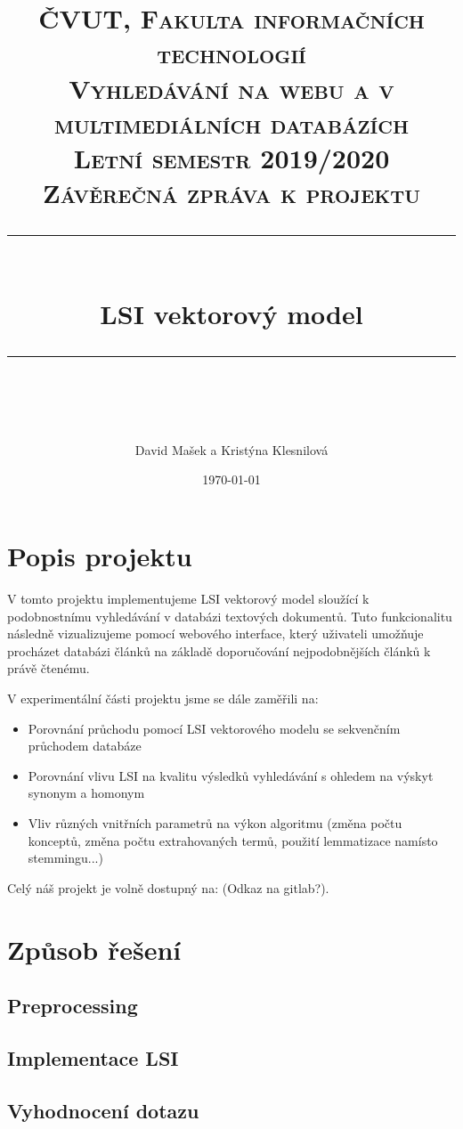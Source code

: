 \documentclass[11pt]{scrartcl} %
\title{	
	\normalfont\normalsize
	\textsc{ČVUT, Fakulta informačních technologií}\\ %
	\textsc{Vyhledávání na webu a v multimediálních databázích}\\
	\textsc{Letní semestr 2019/2020}\\
	\textsc{Závěrečná zpráva k projektu}\\
	\vspace{25pt} %
	\rule{\linewidth}{0.5pt}\\ %
	\vspace{20pt} %
	{\huge LSI vektorový model}\\ %
	\vspace{12pt} %
	\rule{\linewidth}{2pt}\\ %
	\vspace{12pt} %
}
\author{\LARGE David Mašek a Kristýna Klesnilová} %
\date{\normalsize\today} %
\begin{document}
\maketitle %

\newpage

\tableofcontents

\newpage

\section{Popis projektu}

V tomto projektu implementujeme LSI vektorový model sloužící k podobnostnímu vyhledávání v databázi textových dokumentů. Tuto funkcionalitu následně vizualizujeme pomocí webového interface, který uživateli umožňuje procházet databázi článků na základě doporučování nejpodobnějších článků k právě čtenému.

\bigskip 

V experimentální části projektu jsme se dále zaměřili na:
\begin{itemize}
	\item Porovnání průchodu pomocí LSI vektorového modelu se sekvenčním průchodem databáze
	\item Porovnání vlivu LSI na kvalitu výsledků vyhledávání s ohledem na výskyt synonym a homonym
	\item Vliv různých vnitřních parametrů na výkon algoritmu (změna počtu konceptů, změna počtu extrahovaných termů, použití lemmatizace namísto stemmingu...)
\end{itemize}

\bigskip 

Celý náš projekt je volně dostupný na: (Odkaz na gitlab?).

\section{Způsob řešení}

\subsection{Preprocessing}

\subsection{Implementace LSI}

\subsection{Vyhodnocení dotazu}
\end{document}
